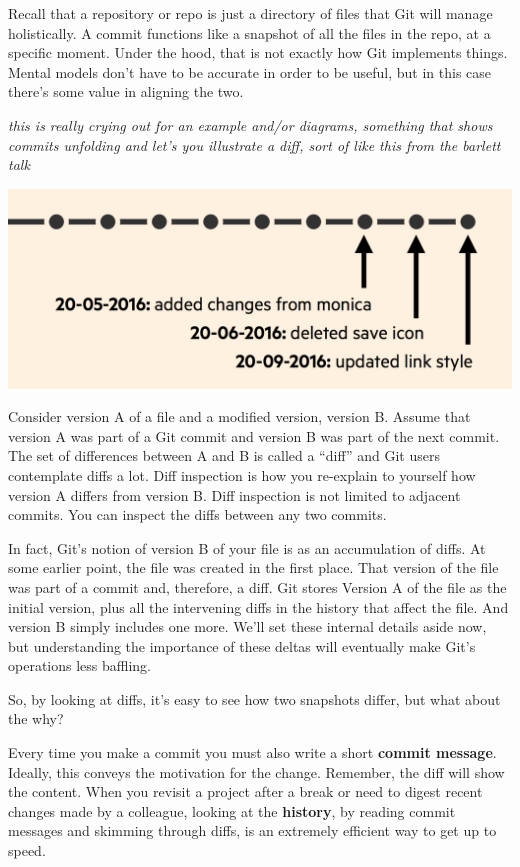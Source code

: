 \documentclass[12pt]{article}
\begin{document}
Recall that a repository or repo is just a directory of files that Git
will manage holistically. A commit functions like a snapshot of all the
files in the repo, at a specific moment. Under the hood, that is not
exactly how Git implements things. Mental models don't have to be
accurate in order to be useful, but in this case there's some value in
aligning the two.

\emph{this is really crying out for an example and/or diagrams,
something that shows commits unfolding and let's you illustrate a diff,
sort of like this from the barlett talk}

\includegraphics[width=1\linewidth]{bartlett-commit-history}

Consider version A of a file and a modified version, version B. Assume
that version A was part of a Git commit and version B was part of the
next commit. The set of differences between A and B is called a ``diff''
and Git users contemplate diffs a lot. Diff inspection is how you
re-explain to yourself how version A differs from version B. Diff
inspection is not limited to adjacent commits. You can inspect the diffs
between any two commits.

In fact, Git's notion of version B of your file is as an accumulation of
diffs. At some earlier point, the file was created in the first place.
That version of the file was part of a commit and, therefore, a diff.
Git stores Version A of the file as the initial version, plus all the
intervening diffs in the history that affect the file. And version B
simply includes one more. We'll set these internal details aside now,
but understanding the importance of these deltas will eventually make
Git's operations less baffling.

So, by looking at diffs, it's easy to see how two snapshots differ, but
what about the why?

Every time you make a commit you must also write a short \textbf{commit
message}. Ideally, this conveys the motivation for the change. Remember,
the diff will show the content. When you revisit a project after a break
or need to digest recent changes made by a colleague, looking at the
\textbf{history}, by reading commit messages and skimming through diffs,
is an extremely efficient way to get up to speed.
\end{document}
